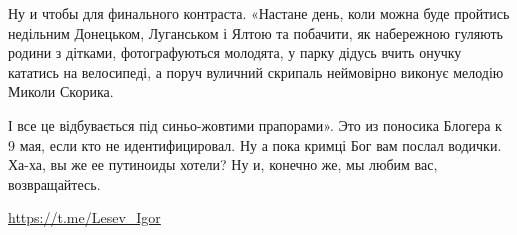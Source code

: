 Ну и чтобы для финального контраста. «Настане день, коли можна буде пройтись
недільним Донецьком, Луганськом і Ялтою та побачити, як набережною гуляють
родини з дітками, фотографуються молодята, у парку дідусь вчить онучку кататись
на велосипеді, а поруч вуличний скрипаль неймовірно виконує мелодію Миколи
Скорика.

І все це відбувається під синьо-жовтими прапорами». Это из поносика Блогера к 9
мая, если кто не идентифицировал. Ну а пока кримці Бог вам послал водички.
Ха-ха, вы же ее путиноиды хотели? Ну и, конечно же, мы любим вас,
возвращайтесь.

\url{https://t.me/Lesev_Igor}



